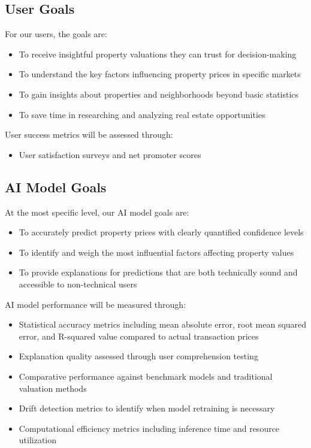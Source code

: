 \subsection{User Goals}

For our users, the goals are:

\begin{itemize}
	\item To receive insightful property valuations they can trust for decision-making
	\item To understand the key factors influencing property prices in specific markets
	\item To gain insights about properties and neighborhoods beyond basic statistics
	\item To save time in researching and analyzing real estate opportunities
\end{itemize}

User success metrics will be assessed through:

\begin{itemize}
	\item User satisfaction surveys and net promoter scores
\end{itemize}

\subsection{AI Model Goals}

At the most specific level, our AI model goals are:

\begin{itemize}
	\item To accurately predict property prices with clearly quantified confidence levels
	\item To identify and weigh the most influential factors affecting property values
	\item To provide explanations for predictions that are both technically sound and accessible to non-technical users
\end{itemize}

AI model performance will be measured through:

\begin{itemize}
	\item Statistical accuracy metrics including mean absolute error, root mean squared error, and R-squared value compared to actual transaction prices
	\item Explanation quality assessed through user comprehension testing
	\item Comparative performance against benchmark models and traditional valuation methods
	\item Drift detection metrics to identify when model retraining is necessary
	\item Computational efficiency metrics including inference time and resource utilization
\end{itemize}

